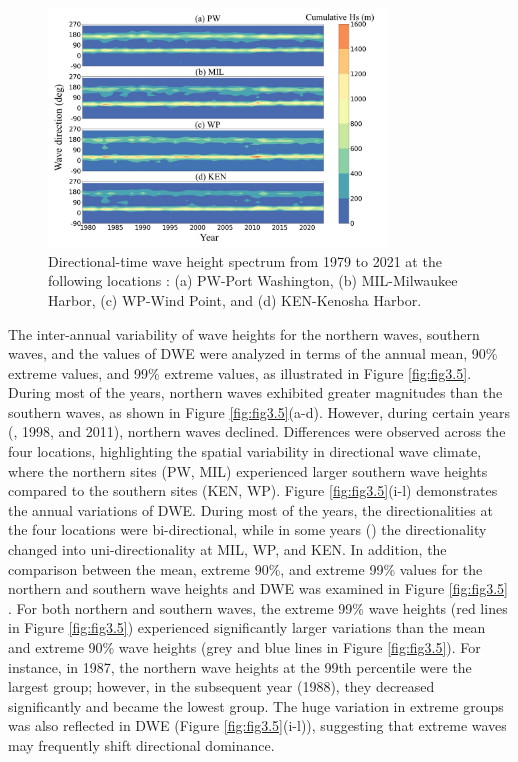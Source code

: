 \begin{figure}[htbp]
  \centering
  \includegraphics[width=0.8\textwidth]{chapter3/resources/figure3-4.jpg}
  \caption{Directional-time wave height spectrum from 1979 to 2021 at the following locations : (a) PW-Port Washington, (b) MIL-Milwaukee Harbor, (c) WP-Wind Point, and (d) KEN-Kenosha Harbor.}
  \label{fig:fig3.4}
\end{figure}

The inter-annual variability of wave heights for the northern waves, southern waves, and the values of DWE were analyzed in terms of the annual mean, 90\% extreme values, and 99\% extreme values, as illustrated in Figure \ref{fig:fig3.5}. During most of the years, northern waves exhibited greater magnitudes than the southern waves, as shown in Figure \ref{fig:fig3.5}(a-d). However, during certain years (, 1998, and 2011), northern waves declined. Differences were observed across the four locations, highlighting the spatial variability in directional wave climate, where the northern sites (\eg PW, MIL) experienced larger southern wave heights compared to the southern sites (\eg KEN, WP). Figure \ref{fig:fig3.5}(i-l) demonstrates the annual variations of DWE. During most of the years, the directionalities at the four locations were bi-directional, while in some years () the directionality changed into uni-directionality at MIL, WP, and KEN. In addition, the comparison between the mean, extreme 90\%, and extreme 99\% values for the northern and southern wave heights and DWE was examined in Figure \ref{fig:fig3.5} . For both northern and southern waves, the extreme 99\% wave heights (red lines in Figure \ref{fig:fig3.5}) experienced significantly larger variations than the mean and extreme 90\% wave heights (grey and blue lines in Figure \ref{fig:fig3.5}). For instance, in 1987, the northern wave heights at the 99th percentile were the largest group; however, in the subsequent year (1988), they decreased significantly and became the lowest group. The huge variation in extreme groups was also reflected in DWE (Figure \ref{fig:fig3.5}(i-l)), suggesting that extreme waves may frequently shift directional dominance.

